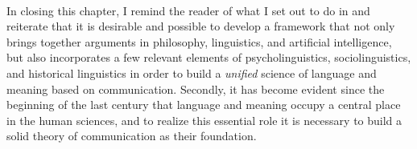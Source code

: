 ~\\
In closing this chapter, I remind the reader of what I set out to do in  and reiterate that it is desirable and possible to develop a framework that not only brings together arguments in philosophy, linguistics, and artificial intelligence, but also incorporates a few relevant elements of psycholinguistics, sociolinguistics, and historical linguistics in order to build a \emph{unified} science of language and meaning based on communication. Secondly, it has become evident since the beginning of the last century that language and meaning occupy a central place in the human sciences, and to realize this essential role it is necessary to build a solid theory of communication as their foundation.


%
%



%
%
%
%
%
%
%
%
%
%
%
%
%
%
%

